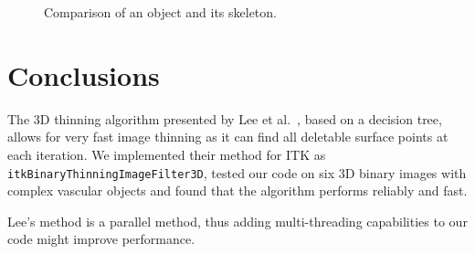 \documentclass{InsightArticle}
\begin{document}
\begin{center}%
\begin{figure}[h]%
\begin{centering}
\hspace{0.05\textwidth}%
\par%
\end{centering}
\caption{Comparison of an object and its skeleton.\label{fig:results-thinning} }
\end{figure}
\par\end{center}

\section{Conclusions}
The 3D thinning algorithm presented by Lee et al.~, based on a decision tree, allows for very fast image thinning as it can find all deletable surface points at each iteration. We implemented their  method for ITK as \texttt{itkBinaryThinningImageFilter3D}, tested our code on six 3D binary images with complex vascular objects and found that the algorithm performs reliably and fast.

Lee's method is a parallel method, thus adding multi-threading capabilities to our code might improve performance.

%
%



\end{document}
